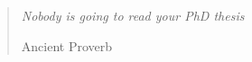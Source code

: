 \documentclass[officiallayout,final]{unihelcompling}
\renewcommand{\:}{\mbox{${\rm :}$}}
\begin{document}


\def\arraystretch{1.2}

\clearpage
%
\frontmatter
\maketitle
\vspace*{\fill}
\thispagestyle{empty} 
\begin{quotation}
\em %
Nobody is going to read your PhD thesis

\medskip
\raggedleft
Ancient Proverb
\end{quotation}
\vspace*{\fill}
\onehalfspacing

%

\mainmatter

\tableofcontents
\listoffigures
\listoftables
{}
\end{document}
